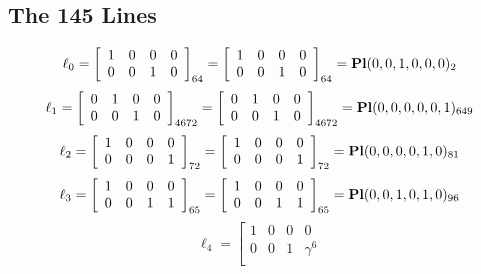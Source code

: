 \documentclass{article}
\begin{document}
{\subsection*{The 145 Lines}
$$
\ell_{0} = 
\left[
\begin{array}{*{4}{r}}
1 & 0 & 0 & 0\\
0 & 0 & 1 & 0\\
\end{array}
\right]
_{64}
=
\left[
\begin{array}{*{4}c}
1  & 0  & 0  & 0\\
0  & 0  & 1  & 0\\
\end{array}
\right]_{64}
={\rm\bf Pl}(0,0,1,0,0,0 )_{2}$$
$$
\ell_{1} = 
\left[
\begin{array}{*{4}{r}}
0 & 1 & 0 & 0\\
0 & 0 & 1 & 0\\
\end{array}
\right]
_{4672}
=
\left[
\begin{array}{*{4}c}
0  & 1  & 0  & 0\\
0  & 0  & 1  & 0\\
\end{array}
\right]_{4672}
={\rm\bf Pl}(0,0,0,0,0,1 )_{649}$$
$$
\ell_{2} = 
\left[
\begin{array}{*{4}{r}}
1 & 0 & 0 & 0\\
0 & 0 & 0 & 1\\
\end{array}
\right]
_{72}
=
\left[
\begin{array}{*{4}c}
1  & 0  & 0  & 0\\
0  & 0  & 0  & 1\\
\end{array}
\right]_{72}
={\rm\bf Pl}(0,0,0,0,1,0 )_{81}$$
$$
\ell_{3} = 
\left[
\begin{array}{*{4}{r}}
1 & 0 & 0 & 0\\
0 & 0 & 1 & 1\\
\end{array}
\right]
_{65}
=
\left[
\begin{array}{*{4}c}
1  & 0  & 0  & 0\\
0  & 0  & 1  & 1\\
\end{array}
\right]_{65}
={\rm\bf Pl}(0,0,1,0,1,0 )_{96}$$
$$
\ell_{4} = 
\left[
\begin{array}{*{4}{r}}
1 & 0 & 0 & 0\\
0 & 0 & 1 & \gamma^{6}\\
\end{array}
$$}
\end{document}
